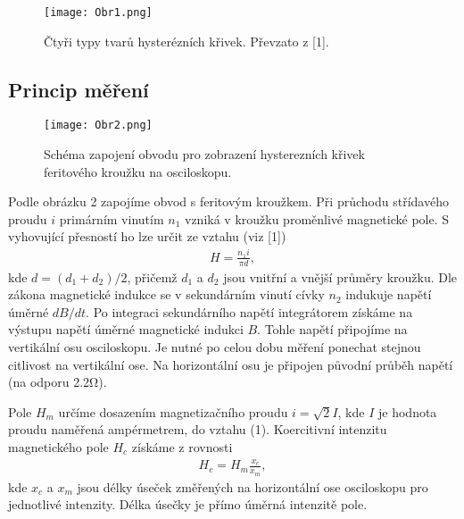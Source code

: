 \documentclass{article}
\begin{document}
\begin{figure}[h!]
\centering
\texttt{[image: Obr1.png]}
\caption{Čtyři typy tvarů hysterézních křivek. Převzato z [1].}
\label{fig:test}
\end{figure}

\subsection{Princip měření}
\begin{figure}[h!]
\centering
\texttt{[image: Obr2.png]}
\caption{Schéma zapojení obvodu pro zobrazení hysterezních křivek feritového kroužku na osciloskopu.}
\end{figure}
\par Podle obrázku 2 zapojíme obvod s feritovým kroužkem. Při průchodu střídavého proudu $i$ primárním vinutím $n_1$ vzniká v kroužku proměnlivé magnetické pole. S vyhovující přesností ho lze určit ze vztahu (viz [1])
\begin{align}
    H = \frac{n_1 i}{\pi d},
\end{align}
kde $d = (d_1 + d_2)/2$, přičemž $d_1$ a $d_2$ jsou vnitřní a vnější průměry kroužku. Dle zákona magnetické indukce se v sekundárním vinutí cívky $n_2$ indukuje napětí úměrné $dB/dt$. Po integraci sekundárního napětí integrátorem získáme na výstupu napětí úměrné magnetické indukci $B$. Tohle napětí připojíme na vertikální osu osciloskopu. Je nutné po celou dobu měření ponechat stejnou citlivost na vertikální ose. Na horizontální osu je připojen původní průběh napětí (na odporu 2.2$\mathrm{\Omega}$).
\par Pole $H_m$ určíme dosazením magnetizačního proudu $i = \sqrt{2}I$, kde $I$ je hodnota proudu naměřená ampérmetrem, do vztahu (1). Koercitivní intenzitu magnetického pole $H_c$ získáme z rovnosti
\begin{align}
    H_c = H_m \frac{x_c}{x_m},
\end{align}
kde $x_c$ a $x_m$ jsou délky úseček změřených na horizontální ose osciloskopu pro jednotlivé intenzity. Délka úsečky je přímo úměrná intenzitě pole.
\end{document}
